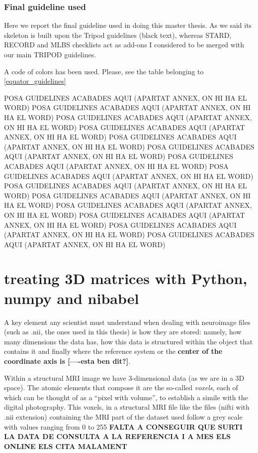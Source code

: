 			\subsubsection{Final guideline used} \label{final-guideline-used}
			
			
			Here we report the final guideline used in doing this master thesis. As we said its skeleton is built upon the Tripod guidelines (black text), whereas STARD, RECORD and MLBS checklists act as add-ons I considered to be merged with our main TRIPOD guidelines.
			
			A code of colors has been used. Please, see the table belonging to \ref{equator_guidelines}

	POSA GUIDELINES ACABADES AQUI (APARTAT ANNEX, ON HI HA EL WORD)	POSA GUIDELINES ACABADES AQUI (APARTAT ANNEX, ON HI HA EL WORD)
		POSA GUIDELINES ACABADES AQUI (APARTAT ANNEX, ON HI HA EL WORD)
		POSA GUIDELINES ACABADES AQUI (APARTAT ANNEX, ON HI HA EL WORD)
		POSA GUIDELINES ACABADES AQUI (APARTAT ANNEX, ON HI HA EL WORD)
		POSA GUIDELINES ACABADES AQUI (APARTAT ANNEX, ON HI HA EL WORD)
		POSA GUIDELINES ACABADES AQUI (APARTAT ANNEX, ON HI HA EL WORD)
		POSA GUIDELINES ACABADES AQUI (APARTAT ANNEX, ON HI HA EL WORD)
		POSA GUIDELINES ACABADES AQUI (APARTAT ANNEX, ON HI HA EL WORD)
		POSA GUIDELINES ACABADES AQUI (APARTAT ANNEX, ON HI HA EL WORD)
		POSA GUIDELINES ACABADES AQUI (APARTAT ANNEX, ON HI HA EL WORD)
		POSA GUIDELINES ACABADES AQUI (APARTAT ANNEX, ON HI HA EL WORD)
		POSA GUIDELINES ACABADES AQUI (APARTAT ANNEX, ON HI HA EL WORD)
		POSA GUIDELINES ACABADES AQUI (APARTAT ANNEX, ON HI HA EL WORD)
	

		
	\section{treating 3D matrices with Python, numpy and nibabel}
		
		A key element any scientist must understand when dealing with neuroimage files (such as .nii, the ones used in this thesis) is how they are stored: namely, how many dimensions the data has, how this data is structured within the object that contains it and finally where the reference system or the \textbf{center of the coordinate axis is [----esta ben dit?]}.
		
		Within a structural MRI image we have 3-dimensional data (as we are in a 3D space). The atomic elements that compose it are the so-called \textit{voxels}, each of which can be thought of as a ``pixel with volume'', to establish a simile with the digital photography. This voxels, in a structural MRI file like the files (nifti with .nii extension) containing the MRI part of the dataset used follow a grey scale with values ranging from 0 to 255 \cite{Fisher2003} \textbf{       FALTA A CONSEGUIR QUE SURTI LA DATA DE CONSULTA A LA REFERENCIA I A MES ELS ONLINE ELS CITA MALAMENT     }
		
